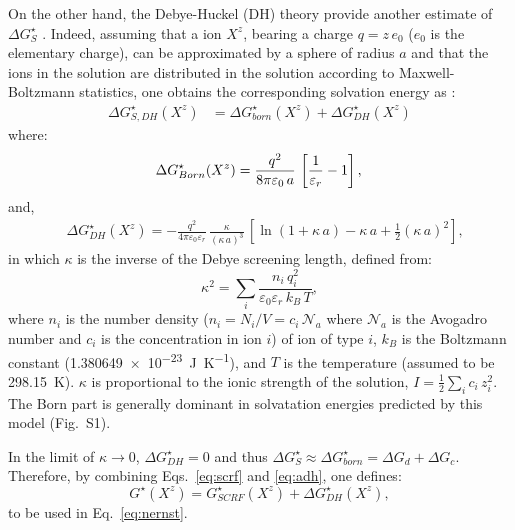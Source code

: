 \documentclass[review,preprint]{elsarticle}
\begin{document}
On the other hand, the Debye-Huckel (DH) theory provide another estimate of $\Delta G_{S}^\star$ \cite{bockrisModernElectrochemistryIonics1998}. Indeed, assuming that a ion $X^z$, bearing a charge $q = z\,e_0$ ($e_0$ is the elementary charge), can be approximated by a sphere of radius $a$ and that the ions in the solution are distributed in the solution according to Maxwell-Boltzmann statistics, one obtains the corresponding solvation energy as \cite{kontogeorgisDebyeHuckelTheoryIts2018,silvaDerivationsDebyeHuckel2022,silvaImprovingBornEquation2024}:\begin{align}
	\Delta G^\star_{S,DH}(X^z)
	&= \Delta G^\star_{born}(X^z) + \Delta G^\star_{DH}(X^z)\label{eq:adh}
\end{align}
where:
\begin{equation}
	\Delta G^\star_{Born}(X^z) =\frac{q^2}{8\pi\varepsilon_0\,a}\,\left[\frac{1}{\varepsilon_r}-1\right], \label{eq:born}\\
\end{equation}
and,
\begin{align}
	&\Delta G^\star_{DH}(X^z) = -\frac{q^2}{4\pi\varepsilon_0\varepsilon_r}\,\frac{\kappa}{(\kappa\,a)^3}\,\left[\ln(1+\kappa\,a)-\kappa\,a+\frac{1}{2}(\kappa\,a)^2\right],\label{eq:dh} \end{align}
in which $\kappa$ is the inverse of the Debye screening length, defined from:\begin{equation}
	\kappa^2 = \sum_i \frac{n_i\,q_i^2}{\varepsilon_0\varepsilon_r\,k_B\,T}, \label{eq:kappa2}
\end{equation}
where $n_i$ is the number density ($n_i = N_i / V = c_i\,\mathcal{N}_a$ where $\mathcal{N}_a$ is the Avogadro number and $c_i$ is the concentration in ion $i$) of ion of type $i$, $k_B$ is the Boltzmann constant (\SI{1.380649e-23}{\joule\per\kelvin}), and $T$ is the temperature (assumed to be \SI{298.15}{\kelvin}).  $\kappa$ is  proportional to the ionic strength of the solution, $I = \frac{1}{2}\sum_i c_i\,z_i^2$.  The Born part is generally dominant in solvatation energies predicted by this model (Fig.~S1).

In the limit of $\kappa\to 0$,  $\Delta G^\star_{DH} = 0$ and thus $\Delta G^\star_S \approx \Delta G^\star_{born} = \Delta G_d + \Delta G_c$.  Therefore, by combining Eqs.~\eqref{eq:scrf} and \eqref{eq:adh}, one defines:\begin{equation}
	G^\star(X^z) = G^\star_{SCRF}(X^z) + \Delta G^\star_{DH}(X^z), \label{eq:gtot}
\end{equation}
to be used in Eq.~\eqref{eq:nernst}.
\end{document}
